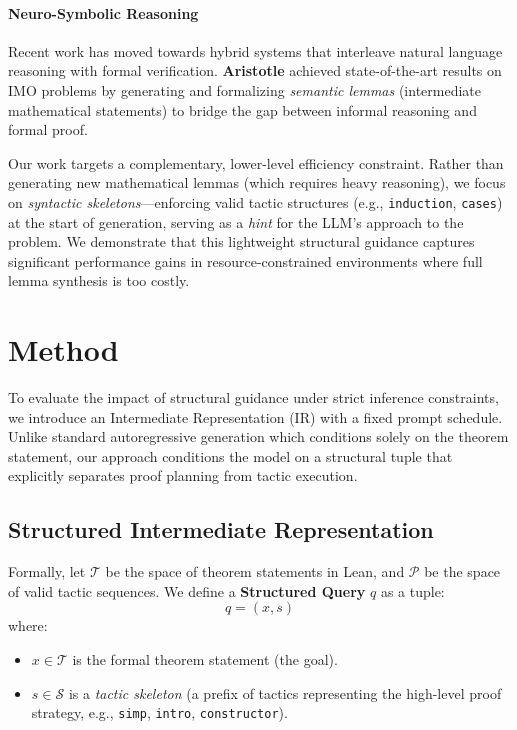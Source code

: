 \documentclass{article}
\begin{document}
\paragraph{Neuro-Symbolic Reasoning}
Recent work has moved towards hybrid systems that interleave natural language reasoning with formal verification. \textbf{Aristotle} \cite{achim2025aristotle} achieved state-of-the-art results on IMO problems by generating and formalizing \textit{semantic lemmas} (intermediate mathematical statements) to bridge the gap between informal reasoning and formal proof. 

Our work targets a complementary, lower-level efficiency constraint. Rather than generating new mathematical lemmas (which requires heavy reasoning), we focus on \textit{syntactic skeletons}—enforcing valid tactic structures (e.g., \texttt{induction}, \texttt{cases}) at the start of generation, serving as a   \textit{hint} for the LLM's approach to the problem. We demonstrate that this lightweight structural guidance captures significant performance gains in resource-constrained environments where full lemma synthesis is too costly.


\section{Method}

To evaluate the impact of structural guidance under strict inference constraints, we introduce an Intermediate Representation (IR) with a fixed prompt schedule. Unlike standard autoregressive generation which conditions solely on the theorem statement, our approach conditions the model on a structural tuple that explicitly separates proof planning from tactic execution.

\subsection{Structured Intermediate Representation}
Formally, let $\mathcal{T}$ be the space of theorem statements in Lean, and $\mathcal{P}$ be the space of valid tactic sequences. We define a \textbf{Structured Query} $q$ as a tuple:
\begin{equation}
    q = (x, s)
\end{equation}
where:
\begin{itemize}
    \item $x \in \mathcal{T}$ is the formal theorem statement (the goal).
    \item $s \in \mathcal{S}$ is a \textit{tactic skeleton} (a prefix of tactics representing the high-level proof strategy, e.g., \texttt{simp}, \texttt{intro}, \texttt{constructor}).
\end{itemize}
\end{document}
